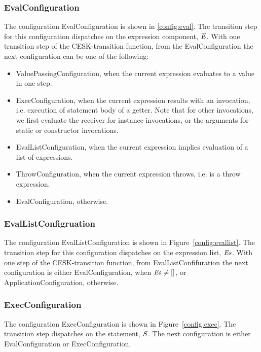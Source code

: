 \documentclass[a4paper,oneside,fleqn]{article}
\begin{document}
\subsubsection{EvalConfiguration}
\label{subsubsec:evalconfig}

The configuration EvalConfiguration is shown in \ref{config:eval}.
The transition step for this configuration dispatches on the expression component, $\mathit{E}$.
With one transition step of the CESK-transition function, from the EvalConfiguration the next configuration can be one of the following:

\begin{itemize}
    \item ValuePassingConfiguration, when the current expression evaluates to a value in one step.
    \item ExecConfiguration, when the current expression results with an invocation, i.e. execution of statement body of a getter.
        Note that for other invocations, we first evaluate the receiver for instance invocations, or the arguments for static or constructor invocations.
    \item EvalListConfiguration, when the current expression implies evaluation of a list of expressions.
    \item ThrowConfiguration, when the current expression throws, i.e. is a throw expression.
    \item EvalConfiguration, otherwise.
\end{itemize}


\subsubsection{EvalListConfigruation}
\label{subsubsec:evallistconfig}

The configuration EvalListConfiguration is shown in Figure~\ref{config:evallist}.
The transition step for this configuration dispatches on the expression list, $\mathit{E}\mathit{s}$.
With one step of the CESK-transition function, from EvalListConfifuration the next configuration is either EvalConfiguration, when $\mathit{E}\mathit{s} \neq []$, or ApplicationConfiguration, otherwise.


\subsubsection{ExecConfiguration}
\label{subsubsec:execconfig}

The configuration ExecConfiguration is shown in Figure~\ref{config:exec}.
The transition step dispatches on the statement, $\mathit{S}$.
The next configuration is either EvalConfiguration or ExecConfiguration.
\end{document}
